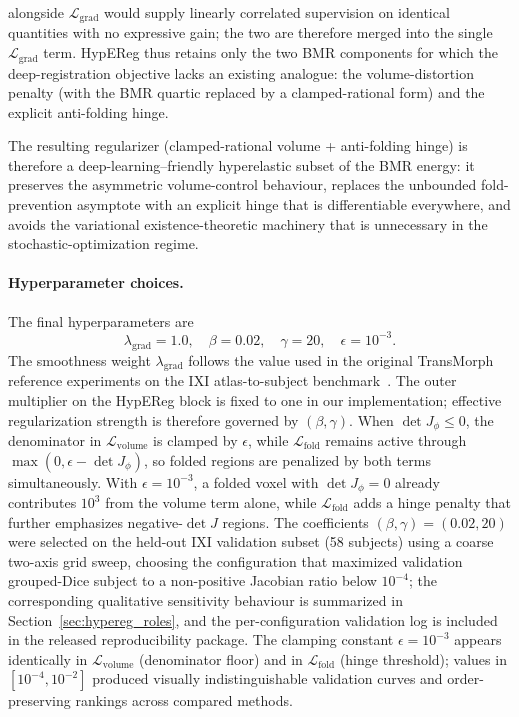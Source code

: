 \documentclass[jimaging,article,submit,pdftex,moreauthors]{Definitions/mdpi}
\begin{document}
alongside \(\mathcal{L}_{\mathrm{grad}}\) would supply linearly correlated supervision on identical quantities with no expressive gain; the two are therefore merged into the single \(\mathcal{L}_{\mathrm{grad}}\) term. HypEReg thus retains only the two BMR components for which the deep-registration objective lacks an existing analogue: the volume-distortion penalty (with the BMR quartic replaced by a clamped-rational form) and the explicit anti-folding hinge.

The resulting regularizer (clamped-rational volume + anti-folding hinge) is therefore a deep-learning--friendly hyperelastic subset of the BMR energy: it preserves the asymmetric volume-control behaviour, replaces the unbounded fold-prevention asymptote with an explicit hinge that is differentiable everywhere, and avoids the variational existence-theoretic machinery that is unnecessary in the stochastic-optimization regime.

\paragraph{Hyperparameter choices.} The final hyperparameters are
\[
\lambda_{\mathrm{grad}} = 1.0, \quad
\beta = 0.02, \quad
\gamma = 20, \quad
\epsilon = 10^{-3}.
\]
The smoothness weight \(\lambda_{\mathrm{grad}}\) follows the value used in the original TransMorph reference experiments on the IXI atlas-to-subject benchmark~\cite{chen2022transmorph}.
The outer multiplier on the HypEReg block is fixed to one in our implementation; effective regularization strength is therefore governed by \((\beta,\gamma)\).
When \(\det J_\phi \le 0\), the denominator in \(\mathcal{L}_{\mathrm{volume}}\) is clamped by \(\epsilon\), while \(\mathcal{L}_{\mathrm{fold}}\) remains active through \(\max(0,\epsilon-\det J_\phi)\), so folded regions are penalized by both terms simultaneously. With \(\epsilon=10^{-3}\), a folded voxel with \(\det J_\phi=0\) already contributes \(10^3\) from the volume term alone, while \(\mathcal{L}_{\mathrm{fold}}\) adds a hinge penalty that further emphasizes negative-\(\det J\) regions. The coefficients \((\beta,\gamma)=(0.02,20)\) were selected on the held-out IXI validation subset (58 subjects) using a coarse two-axis grid sweep, choosing the configuration that maximized validation grouped-Dice subject to a non-positive Jacobian ratio below \(10^{-4}\); the corresponding qualitative sensitivity behaviour is summarized in Section~\ref{sec:hypereg_roles}, and the per-configuration validation log is included in the released reproducibility package. The clamping constant \(\epsilon=10^{-3}\) appears identically in \(\mathcal{L}_{\mathrm{volume}}\) (denominator floor) and in \(\mathcal{L}_{\mathrm{fold}}\) (hinge threshold); values in \([10^{-4},10^{-2}]\) produced visually indistinguishable validation curves and order-preserving rankings across compared methods.
\end{document}
